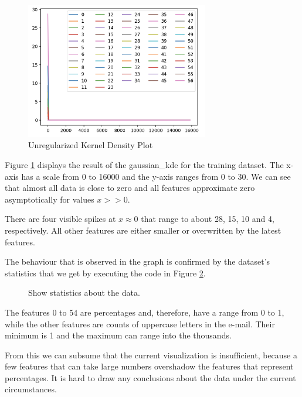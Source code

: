 \documentclass{support/acm_proc_article-sp}
\begin{document}
    \begin{figure}[!htbp]
        \centering
        \includegraphics[width=8cm]{images/kdp.png}
        \caption{Unregularized Kernel Density Plot}
        \label{fig:kernel-density-plot}
    \end{figure}

    Figure \ref{fig:kernel-density-plot} displays the result of the gaussian\_kde for the training dataset.
    The x-axis has a scale from 0 to 16000 and the y-axis ranges from 0 to 30.
    We can see that almost all data is close to zero and all features approximate zero asymptotically for values $x >> 0$.

    There are four visible spikes at $x \approx 0$ that range to about 28, 15, 10 and 4, respectively.
    All other features are either smaller or overwritten by the latest features.

    The behaviour that is observed in the graph is confirmed by the dataset's statistics that we get by executing the
    code in Figure \ref{fig:describe}.
    \begin{figure}[htbp]
        \centering
        \lstset{numbers=none,xleftmargin=0em}
        
        \caption{Show statistics about the data.}
        \label{fig:describe}
    \end{figure}
    The features 0 to 54 are percentages and, therefore, have a range from 0 to 1, while the other features are counts of
    uppercase letters in the e-mail.
    Their minimum is 1 and the maximum can range into the thousands.

    From this we can subsume that the current visualization is insufficient, because a few features that can take large numbers
    overshadow the features that represent percentages.
    It is hard to draw any conclusions about the data under the current circumstances.

\end{document}
